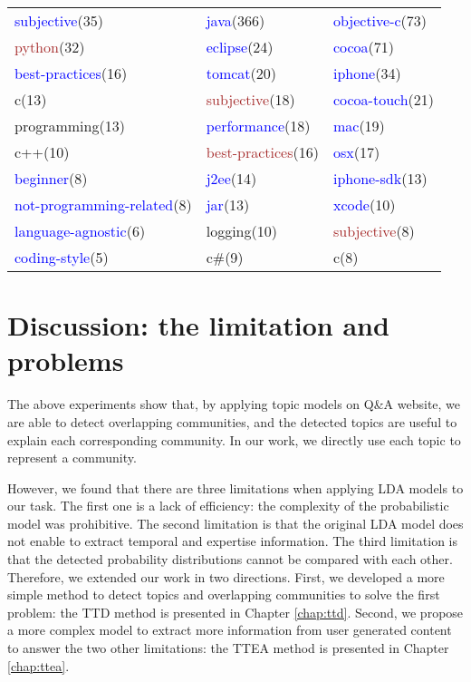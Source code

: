 \begin{table}[htbp]
\begin{tabular}{|p{60pt}|p{60pt}|p{60pt}|}
\hline
\textcolor{blue}{subjective}(35)&\textcolor{blue}{java}(366)&\textcolor{blue}{objective-c}(73)\\
\textcolor{brown}{python}(32)&\textcolor{blue}{eclipse}(24)&\textcolor{blue}{cocoa}(71)\\
\textcolor{blue}{best-practices}(16)&\textcolor{blue}{tomcat}(20)&\textcolor{blue}{iphone}(34)\\
c(13)&\textcolor{brown}{subjective}(18)&\textcolor{blue}{cocoa-touch}(21)\\
programming(13)&\textcolor{blue}{performance}(18)&\textcolor{blue}{mac}(19)\\
c++(10)&\textcolor{brown}{best-practices}(16)&\textcolor{blue}{osx}(17)\\
\textcolor{blue}{beginner}(8)&\textcolor{blue}{j2ee}(14)&\textcolor{blue}{iphone-sdk}(13)\\
\textcolor{blue}{not-programming-related}(8)&\textcolor{blue}{jar}(13)&\textcolor{blue}{xcode}(10)\\
\textcolor{blue}{language-agnostic}(6)&logging(10)&\textcolor{brown}{subjective}(8)\\
\textcolor{blue}{coding-style}(5)&c\#(9)&c(8)\\
\hline
\end{tabular}
\end{table}

\section{Discussion: the limitation and problems}
The above experiments show that, by applying topic models on Q\&A website, we are able to detect overlapping communities, and the detected topics are useful to explain each corresponding community. In our work, we directly use each topic to represent a community.

However, we found that there are three limitations when applying LDA models to our task. The first one is a lack of efficiency: the complexity of the probabilistic model was prohibitive. The second limitation is that the  original LDA model does not enable to extract temporal and expertise information. The third limitation is that the detected probability distributions cannot be compared with each other. 
Therefore, we extended our work in two directions. First, we developed a more simple method to detect topics and overlapping communities to solve the first problem: the TTD method is presented in Chapter \ref{chap:ttd}. Second, we propose a more complex model to extract more information from user generated content to answer the two other limitations: the TTEA method is presented in Chapter \ref{chap:ttea}.
